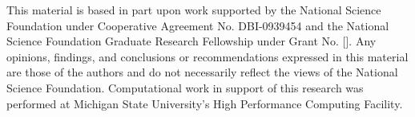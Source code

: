 \documentclass{sig-alternate}
\begin{document}
This material is based in part upon work supported by the National Science Foundation under Cooperative Agreement No. DBI-0939454 and the National Science Foundation Graduate Research Fellowship under Grant No. []. Any opinions, findings, and conclusions or recommendations expressed in this material are those of the authors and do not necessarily reflect the views of the National Science Foundation. Computational work in support of this research was performed at Michigan State University's High Performance Computing Facility.

%


%
%
\end{document}
